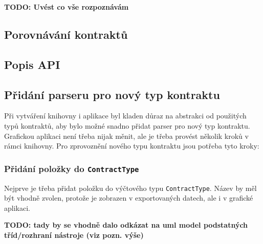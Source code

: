 			\textbf{\textcolor{pblue}{TODO: Uvést co vše rozpoznávám}}\\

	    \subsection{Porovnávání kontraktů}


	    \subsection{Popis API}
	    
	    
	    \subsection{Přidání parseru pro nový typ kontraktu}
	    	Při vytváření knihovny i aplikace byl kladen důraz na abstrakci od použitých typů kontraktů, aby bylo možné snadno přidat parser pro nový typ kontraktu. Grafickou aplikaci není třeba nijak měnit, ale je třeba provést několik kroků v rámci knihovny. Pro zprovoznění nového typu kontraktu jsou potřeba tyto kroky:
	    	
	    	\subsubsection{Přidání položky do \texttt{ContractType}}
	    		Nejprve je třeba přidat položku do výčtového typu \texttt{ContractType}. Název by měl být vhodně zvolen, protože je zobrazen v exportovaných datech, ale i v grafické aplikaci.
	    		
	    		\textbf{\textcolor{pblue}{TODO: tady by se vhodně dalo odkázat na uml model podstatných tříd/rozhraní nástroje (viz pozn. výše) }}\\
	    		
